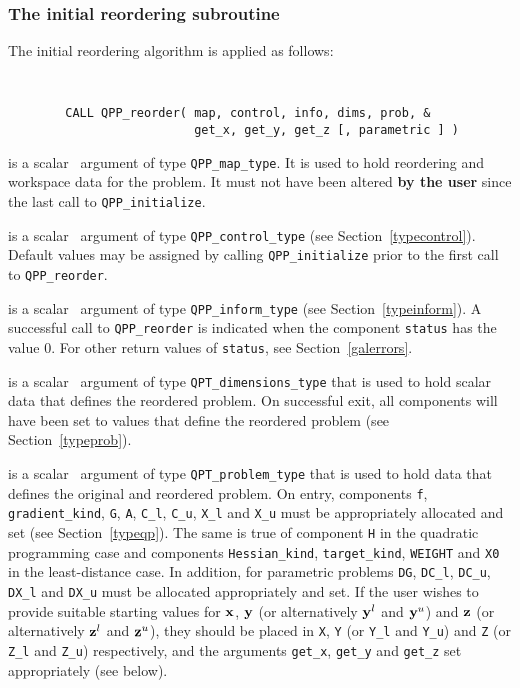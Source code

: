 \documentclass{galahad}
\newcommand{\packagename}{QPP}
\begin{document}
\subsubsection{The initial reordering subroutine}
The initial reordering algorithm is applied as follows:
\vspace*{-2mm}
{\tt
\begin{verbatim}
        CALL QPP_reorder( map, control, info, dims, prob, &
                          get_x, get_y, get_z [, parametric ] )
\end{verbatim}
}
\vspace*{-4mm}
\begin{description}
 is a scalar \intentinout\ argument of type
{\tt \packagename\_map\_type}.
It is used to hold reordering and workspace data for the problem.
It must not have been altered {\bf by the user} since the last call
to {\tt \packagename\_initialize}.

 is a scalar \intentin\ argument of type
{\tt \packagename\_control\_type}
(see Section~\ref{typecontrol}).
Default values may be assigned by calling
{\tt \packagename\_initialize}
prior to the first call to {\tt \packagename\_reorder}.

 is a scalar \intentout\ argument of type
{\tt \packagename\_inform\_type}
(see Section~\ref{typeinform}).
A successful call to {\tt \packagename\_reor\-der} is indicated
when the component {\tt status} has the value 0. For other return values
of {\tt status}, see Section~\ref{galerrors}.

 is a scalar \intentout\ argument of type
{\tt QPT\_dimensions\_type} that
is used to hold scalar data that defines the reordered problem.
On successful exit, all components will have been set to values
that define the reordered problem (see Section~\ref{typeprob}).

 is a scalar \intentinout\ argument of type
{\tt QPT\_problem\_type} that
is used to hold data that defines the original and reordered problem.
On entry, components {\tt f}, {\tt gradient\_kind}, {\tt G},
{\tt A}, {\tt C\_l}, {\tt C\_u}, {\tt X\_l} and {\tt X\_u}
must be appropriately allocated and set (see Section~\ref{typeqp}).
The same is true of component {\tt H} in the quadratic programming case
and components {\tt Hessian\_kind}, {\tt target\_kind},
{\tt WEIGHT} and {\tt X0} in the least-distance case.
In addition, for parametric problems
{\tt DG}, {\tt DC\_l}, {\tt DC\_u}, {\tt DX\_l} and {\tt DX\_u}
must be allocated appropriately and set.
If the user wishes to provide suitable starting values for ${\mathbf{x}}$, ${\mathbf{y}}$
(or alternatively ${\mathbf{y}}^l$ and ${\mathbf{y}}^u$) and
${\mathbf{z}}$ (or alternatively ${\mathbf{z}}^l$ and ${\mathbf{z}}^u$),
they should be placed in {\tt X}, {\tt Y} (or {\tt Y\_l} and {\tt Y\_u})
and {\tt Z} (or {\tt Z\_l} and {\tt Z\_u}) respectively,
and the arguments {\tt get\_x}, {\tt get\_y} and {\tt get\_z}
set appropriately (see below).


\end{description}
\end{document}
